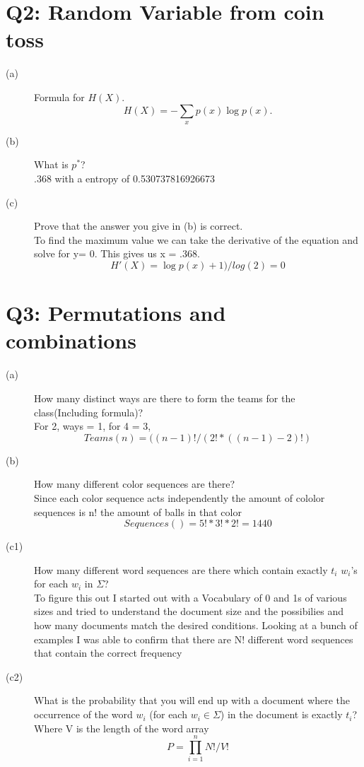 \documentclass[11pt]{article}
\begin{document}
\section{ Q2: Random Variable from coin toss}
 \begin{description}
  \item [(a)]Formula for $H(X)$.
   \begin{equation}
H(X) = -\displaystyle\sum_{x} p(x)\log p(x).
\end{equation}
  \item [(b)]What is $p^*$? \\ .368 with a entropy of 0.530737816926673
  \item [(c)]Prove that the answer you give in (b) is correct. \\ To find the maximum value we can take the derivative of the equation and solve for y= 0. This gives us x = .368. 
   \begin{equation}
H'(X)=\log p(x) +1)/log(2) = 0 
\end{equation}
 \end{description}
\section{ Q3: Permutations and combinations}
 \begin{description}
  \item [(a)]How many distinct ways are there to form the teams for the class(Including formula)? \\For 2, ways = 1, for 4 = 3, 
\begin{equation}
Teams(n) = ((n-1)!/(2!*((n-1)-2)!)
\end{equation}
  \item [(b)]How many different color sequences are there? \\Since each color sequence acts independently the amount of cololor sequences is n! the amount of balls in that color
\begin{equation}
Sequences() = 5!*3!*2! = 1440
\end{equation}
  \item [(c1)]How many different word sequences are there which contain exactly $t_i$ $w_i$'s for each $w_i$ in $\Sigma$? \\ To figure this out I started out with a Vocabulary of 0 and 1s of various sizes and tried to understand the document size and the possibilies and how many documents match the desired conditions. Looking at a bunch of examples I was able to confirm that there are N! different word sequences that contain the correct frequency
  \item [(c2)]What is the probability that you will end up with a document where the occurrence of the word $w_i$ (for each $w_i \in \Sigma$) in the document is exactly $t_i$? \\ 
Where V is the length of the word array
\begin{equation}
P =\prod_{i=1}^n N!/V!
\end{equation}
 \end{description}
\end{document}
